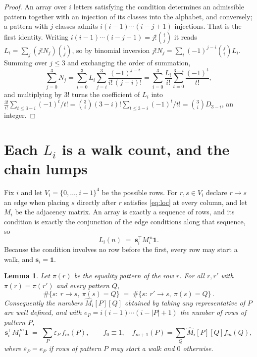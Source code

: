 \documentclass[11pt,a4paper]{article}
\theoremstyle{plain}
\newtheorem{lemma}[theorem]{Lemma}
\theoremstyle{definition}
\begin{document}
\begin{proof}
An array over $i$ letters satisfying the condition determines an admissible pattern together
with an injection of its classes into the alphabet, and conversely; a pattern with $j$
classes admits $i(i-1)\cdots(i-j+1)$ injections. That is the first identity. Writing
$i(i-1)\cdots(i-j+1)=j!\binom{i}{j}$ it reads $L_i=\sum_j (j!N_j)\binom{i}{j}$, so by
binomial inversion $j!N_j=\sum_{i}(-1)^{j-i}\binom{j}{i}L_i$. Summing over
$j\le 3$ and exchanging the order of summation,
\[
\sum_{j=0}^{3}N_j=\sum_{i=0}^{3}L_i\sum_{j=i}^{3}\frac{(-1)^{j-i}}{i!\,(j-i)!}
=\sum_{i=0}^{3}\frac{L_i}{i!}\sum_{t=0}^{3-i}\frac{(-1)^t}{t!} ,
\]
and multiplying by $3!$ turns the coefficient of $L_i$ into
$\frac{3!}{i!}\sum_{t\le 3-i}(-1)^t/t!=\binom{3}{i}(3-i)!\sum_{t\le 3-i}(-1)^t/t!
=\binom{3}{i}D_{3-i}$, an integer.
\end{proof}

\section{Each $L_i$ is a walk count, and the chain lumps}

Fix $i$ and let $V_i=\{0,\dots,i-1\}^{4}$ be the possible rows. For $r,s\in V_i$
declare $r\to s$ an edge when placing $s$ directly after $r$ satisfies \eqref{eq:loc} at
every column, and let $M_i$ be the adjacency matrix. An array is exactly a sequence of
rows, and its condition is exactly the conjunction of the edge conditions along that
sequence, so
\[
L_i(n)\;=\;\mathbf{s}_i^{\!\top}M_i^{\,n}\mathbf{1} .
\]
Because the condition involves no row before the first, every
row may start a walk, and $\mathbf{s}_i=\mathbf{1}$.

\begin{lemma}\label{lem:lump}
Let $\pi(r)$ be the equality pattern of the row $r$. For all $r,r'$ with
$\pi(r)=\pi(r')$ and every pattern $Q$,
\[
\#\{s:\ r\to s,\ \pi(s)=Q\}\;=\;\#\{s:\ r'\to s,\ \pi(s)=Q\}\, .
\]
Consequently the numbers $\widehat M_i[P][Q]$ obtained by taking any representative of $P$
are well defined, and with $e_P=i(i-1)\cdots(i-|P|+1)$ the number of rows of pattern $P$,
\[
\mathbf{s}_i^{\!\top}M_i^{\,m}\mathbf{1}\;=\;\sum_P \varepsilon_P\,f_m(P),
\qquad f_0\equiv1,\quad f_{m+1}(P)=\sum_Q\widehat M_i[P][Q]f_m(Q),
\]
where $\varepsilon_P=e_P$ if rows of pattern $P$ may start a walk and $0$ otherwise.
\end{lemma}
\end{document}
